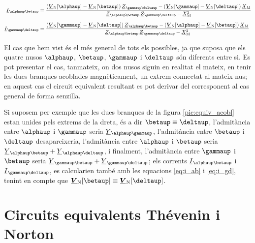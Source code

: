 \begin{subequations}
\begin{align}
    \cmplx{I}_{\alphaup\betaup} &=  \frac{(\mcmplx{V}\ped{N}[\alphaup] - \mcmplx{V}\ped{N}[\betaup]) \, \cmplx{Z}_{\gammaup\deltaup} - (\mcmplx{V}\ped{N}[\gammaup] - \mcmplx{V}\ped{N}[\deltaup]) \,
    \cmplx{X}\ped{M}}{\cmplx{Z}_{\alphaup\betaup}\,
    \cmplx{Z}_{\gammaup\deltaup}-\cmplx{X}\ped{M}^2} \label{eq:i_ab}
    \\[1.5ex]
    \cmplx{I}_{\gammaup\deltaup} &= \frac{(\mcmplx{V}\ped{N}[\gammaup] - \mcmplx{V}\ped{N}[\deltaup]) \, \cmplx{Z}_{\alphaup\betaup} - (\mcmplx{V}\ped{N}[\alphaup] - \mcmplx{V}\ped{N}[\betaup]) \,
    \cmplx{X}\ped{M}}{\cmplx{Z}_{\alphaup\betaup}\,
    \cmplx{Z}_{\gammaup\deltaup}-\cmplx{X}\ped{M}^2} \label{eq:i_gd}
\end{align}
\end{subequations}

El cas que hem vist  és el més general de tots els
possibles, ja que suposa que els quatre nusos $\alphaup$, $\betaup$,
$\gammaup$ i $\deltaup$ són diferents entre si. Es pot presentar el cas,
tanmateix, on dos nusos siguin en realitat el mateix, en tenir les
dues branques acoblades magnèticament, un extrem connectat al mateix
nus; en aquest cas el circuit equivalent resultant es pot derivar
del corresponent al cas general de forma senzilla.

Si suposem per exemple que les dues branques de la figura
\vref{pic:equiv_acobl} estan unides pels extrems de la dreta,
és a dir $\betaup\equiv\deltaup$, l'admitància entre
$\alphaup$ i $\gammaup$ seria $\cmplx{Y}_{\alphaup\gammaup}$, l'admitància
entre $\betaup$ i $\deltaup$ desapareixeria, l'admitància entre $\alphaup$
i $\betaup$ seria $\cmplx{Y}_{\alphaup\betaup} +
\cmplx{Y}_{\alphaup\deltaup}$, i finalment, l'admitància entre $\gammaup$
i $\betaup$ seria $\cmplx{Y}_{\gammaup\betaup} +
\cmplx{Y}_{\gammaup\deltaup}$; els corrents $\cmplx{I}_{\alphaup\betaup}$ i
$\cmplx{I}_{\gammaup\deltaup}$, es calcularien també amb les equacions
\eqref{eq:i_ab} i \eqref{eq:i_gd}, tenint en compte que
$\mcmplx{V}\ped{N}[\betaup]\equiv\mcmplx{V}\ped{N}[\deltaup]$.

\section{Circuits equivalents Thévenin i Norton}   \label{sec:xarxes_Zth}

